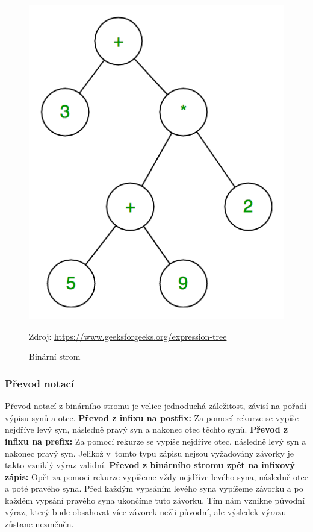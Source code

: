 \documentclass[12pt,a4paper]{report}
\newcommand{\source}[1]{\caption*{Zdroj: {#1}} }
\begin{document}
\begin{figure}[h]
    \centering
    \includegraphics[scale = 0.4]{expression-tree}
    \caption{Binární strom}
	\source{\url {https://www.geeksforgeeks.org/expression-tree}}   

\end{figure}
\newpage 
\subsubsection{Převod notací} 
Převod notací z binárního stromu je velice jednoduchá záležitost, závisí na pořadí výpisu synů a otce. \newline
\textbf{Převod z infixu na postfix:} \newline
Za pomocí rekurze se vypíše nejdříve levý syn, následně pravý syn a nakonec otec těchto synů.\newline
\textbf{Převod z infixu na prefix:} \newline
Za pomocí rekurze se vypíše nejdříve otec, následně levý syn a nakonec pravý syn. Jelikož v~tomto typu zápisu nejsou vyžadovány závorky je takto vzniklý výraz validní.\newline
\textbf{Převod z binárního stromu zpět na infixový zápis:}\newline
Opět za pomoci rekurze vypíšeme vždy nejdříve levého syna, následně otce a poté pravého syna. Před každým vypsáním levého syna vypíšeme závorku a po každém vypsání pravého syna ukončíme tuto závorku. Tím nám vznikne původní výraz, který bude obsahovat více závorek nežli původní, ale výsledek výrazu zůstane nezměněn. 
\end{document}
